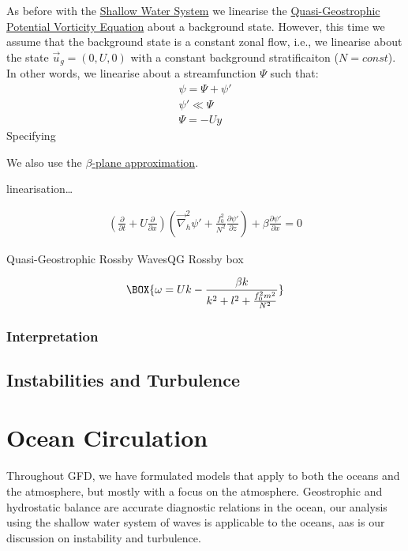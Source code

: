 As before with the \hyperref[Shallow Water System]{Shallow Water System} we linearise the \hyperref[QGPV]{Quasi-Geostrophic Potential Vorticity Equation} about a background state. However, this time we assume that the background state is a constant zonal flow, i.e., we linearise about the state \(\vec{u}_g=(0,U,0)\) with a constant background stratificaiton (\(N=const\)). In other words, we linearise about a streamfunction \(\Psi\) such that:
\begin{align*}
    \psi = \Psi + \psi'
    \\
    \psi' \ll \Psi
    \\
    \Psi = -Uy
\end{align*}
Specifying 

We also use the \hyperref[beta plane box]{\(\beta\)-plane approximation}.

linearisation\dots

\begin{align*}
    \left( \frac{\partial }{\partial t}+U\frac{\partial }{\partial x} \right)
    \left( 
        \vec{\nabla}_h^2 \psi' 
        +\frac{f_0^2}{N^2}\frac{\partial \psi'}{\partial z}
     \right)
    +
    \beta \frac{\partial \psi' }{\partial x}
    =
    0
\end{align*}

\begin{fact}{Quasi-Geostrophic Rossby Waves}{QG Rossby box}\label{QG Rossby box}

    \begin{gather}
        \BOX{
            \omega = Uk - \frac{\beta k}{k^2 + l^2 +\frac{f_0^2 m^2}{N^2}}
        }
    \end{gather}
\end{fact}

\subsection{Interpretation}



\section{Instabilities and Turbulence}

\chapter{Ocean Circulation}\label{Oceans}

Throughout GFD, we have formulated models that apply to both the oceans and the atmosphere, but mostly with a focus on the atmosphere. Geostrophic and hydrostatic balance are accurate diagnostic relations in the ocean, our analysis using the shallow water system of waves is applicable to the oceans, aas is our discussion on instability and turbulence.

